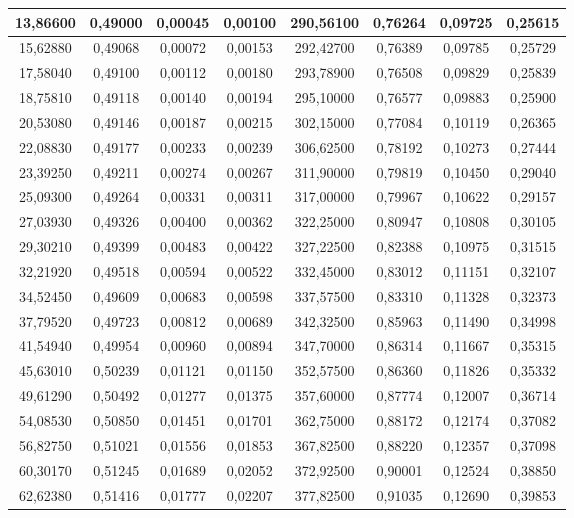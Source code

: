 \documentclass[a4paper,12pt]{article}
\numberwithin{equation}{section}
\begin{document}
\begin{appendices}
\begin{longtable}[c]{|c|c|c|c|c|c|c|c|}
13,86600	&	0,49000	&	0,00045	&	0,00100	&	290,56100	&	0,76264	&	0,09725	&	0,25615	\\\hline
15,62880	&	0,49068	&	0,00072	&	0,00153	&	292,42700	&	0,76389	&	0,09785	&	0,25729	\\\hline
17,58040	&	0,49100	&	0,00112	&	0,00180	&	293,78900	&	0,76508	&	0,09829	&	0,25839	\\\hline
18,75810	&	0,49118	&	0,00140	&	0,00194	&	295,10000	&	0,76577	&	0,09883	&	0,25900	\\\hline
20,53080	&	0,49146	&	0,00187	&	0,00215	&	302,15000	&	0,77084	&	0,10119	&	0,26365	\\\hline
22,08830	&	0,49177	&	0,00233	&	0,00239	&	306,62500	&	0,78192	&	0,10273	&	0,27444	\\\hline
23,39250	&	0,49211	&	0,00274	&	0,00267	&	311,90000	&	0,79819	&	0,10450	&	0,29040	\\\hline
25,09300	&	0,49264	&	0,00331	&	0,00311	&	317,00000	&	0,79967	&	0,10622	&	0,29157	\\\hline
27,03930	&	0,49326	&	0,00400	&	0,00362	&	322,25000	&	0,80947	&	0,10808	&	0,30105	\\\hline
29,30210	&	0,49399	&	0,00483	&	0,00422	&	327,22500	&	0,82388	&	0,10975	&	0,31515	\\\hline
32,21920	&	0,49518	&	0,00594	&	0,00522	&	332,45000	&	0,83012	&	0,11151	&	0,32107	\\\hline
34,52450	&	0,49609	&	0,00683	&	0,00598	&	337,57500	&	0,83310	&	0,11328	&	0,32373	\\\hline
37,79520	&	0,49723	&	0,00812	&	0,00689	&	342,32500	&	0,85963	&	0,11490	&	0,34998	\\\hline
41,54940	&	0,49954	&	0,00960	&	0,00894	&	347,70000	&	0,86314	&	0,11667	&	0,35315	\\\hline
45,63010	&	0,50239	&	0,01121	&	0,01150	&	352,57500	&	0,86360	&	0,11826	&	0,35332	\\\hline
49,61290	&	0,50492	&	0,01277	&	0,01375	&	357,60000	&	0,87774	&	0,12007	&	0,36714	\\\hline
54,08530	&	0,50850	&	0,01451	&	0,01701	&	362,75000	&	0,88172	&	0,12174	&	0,37082	\\\hline
56,82750	&	0,51021	&	0,01556	&	0,01853	&	367,82500	&	0,88220	&	0,12357	&	0,37098	\\\hline
60,30170	&	0,51245	&	0,01689	&	0,02052	&	372,92500	&	0,90001	&	0,12524	&	0,38850	\\\hline
62,62380	&	0,51416	&	0,01777	&	0,02207	&	377,82500	&	0,91035	&	0,12690	&	0,39853	\\\hline

\end{longtable}
\end{appendices}
\end{document}
